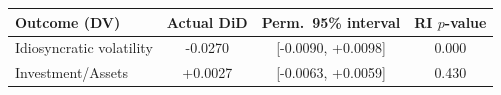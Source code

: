 \begin{tabular}{lccc}
\toprule
Outcome (DV) & Actual DiD & Perm.\ 95\% interval & RI $p$-value \\
\midrule
Idiosyncratic volatility & -0.0270 & [-0.0090, +0.0098] & 0.000 \\
Investment/Assets & +0.0027 & [-0.0063, +0.0059] & 0.430 \\
\bottomrule
\end{tabular}